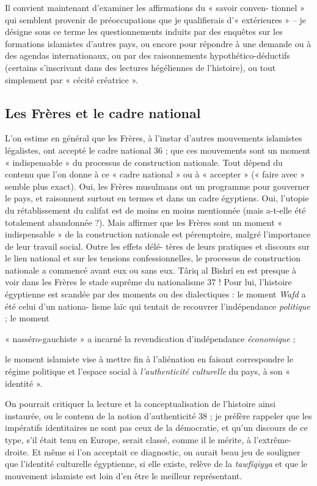  
Il convient maintenant d'examiner les affirmations du « savoir conven-
tionnel » qui semblent provenir de préoccupations que je qualifierais
d'« extérieures » -- je désigne sous ce terme les questionnements
induits par des enquêtes sur les formations islamistes d'autres pays, ou
encore pour répondre à une demande ou à des agendas internationaux, ou
par des raisonnements hypothético-déductifs (certains s'inscrivant dans
des lectures hégéliennes de l'histoire), ou tout simplement par « cécité
créatrice ».
 

\hypertarget{les-fruxe8res-et-le-cadre-national}{%
\subsection{Les Frères et le cadre
national}\label{les-fruxe8res-et-le-cadre-national}}

 
L'on estime en général que les Frères, à l'instar d'autres mouvements
islamistes légalistes, ont accepté le cadre national 36 ; que ces
mouvements sont un moment « indispensable » du processus de construction
nationale. Tout dépend du contenu que l'on donne à ce « cadre national »
ou à « accepter » (« faire avec » semble plus exact). Oui, les Frères
musulmans ont un programme pour gouverner le pays, et raisonnent surtout
en termes et dans un cadre égyptiens. Oui, l'utopie du rétablissement du
califat est de moins en moins mentionnée (mais a-t-elle été totalement
abandonnée ?). Mais affirmer que les Frères sont un moment «
indispensable » de la construction nationale est péremptoire, malgré
l'importance de leur travail social. Outre les effets délé- tères de
leurs pratiques et discours sur le lien national et sur les tensions
confessionnelles, le processus de construction nationale a commencé
avant eux ou sans eux. Târiq al Bishrî en est presque à voir dans les
Frères le stade suprême du nationalisme 37 ! Pour lui, l'histoire
égyptienne est scandée par des moments ou des dialectiques : le moment
\emph{Wafd} a été celui d'un nationa- lisme laïc qui tentait de
recouvrer l'indépendance \emph{politique} ; le moment

« nasséro-gauchiste » a incarné la revendication d'indépendance
\emph{économique} ;

le moment islamiste vise à mettre fin à l'aliénation en faisant
correspondre le régime politique et l'espace social à
\emph{l'authenticité culturelle} du pays, à son
« identité ».

On pourrait critiquer la lecture et la conceptualisation de l'histoire
ainsi instaurée, ou le contenu de la notion d'authenticité 38 ; je
préfère rappeler que les impératifs identitaires ne sont pas ceux de la
démocratie, et qu'un discours de ce type, s'il était tenu en Europe,
serait classé, comme il le mérite, à l'extrême- droite. Et même si l'on
acceptait ce diagnostic, on aurait beau jeu de souligner que l'identité
culturelle égyptienne, si elle existe, relève de la \emph{tawfîqiyya} et
que le mouvement islamiste est loin d'en être le meilleur représentant.
 

